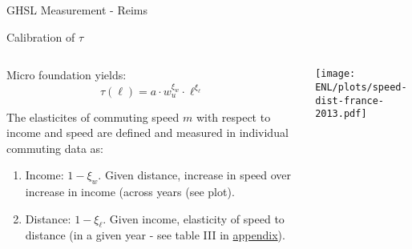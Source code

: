 \documentclass[aspectratio=169]{beamer}
\begin{document}
\begin{frame}[label=GHSL]{GHSL Measurement - Reims \hyperlink{GHSL_measure}{}}

	\centering
			
	

\end{frame}


\begin{frame}[label=tau]{Calibration of $\tau$}
	\begin{columns}
		\begin{column}{0.5\textwidth}
			\begin{midi}
				\item Micro foundation yields:
				\begin{equation*}
					\tau(\ell) = a \cdot w_u^{\xi_w} \cdot \ell^{\xi_\ell}
				\end{equation*}
				\item The elasticites of commuting speed $m$ with respect to income and speed are defined and measured in individual commuting data as:
				\begin{enumerate}
					\item Income: $1 - \xi_w$. Given distance, increase in speed over increase in income (across years (see plot).
					\item Distance: $1 - \xi_\ell$. Given income, elasticity of speed to distance (in a given year - see table III in \href{https://floswald.github.io/pdf/landuse-appendix.pdf}{appendix}).
				\end{enumerate}
			\end{midi}
		\end{column}
		\begin{column}{0.5\textwidth}
				\texttt{[image: \\ENL/plots/speed-dist-france-2013.pdf]}
		\end{column}
	\end{columns}
	\hyperlink{param}{}

\end{frame}


\backupend
\end{document}
